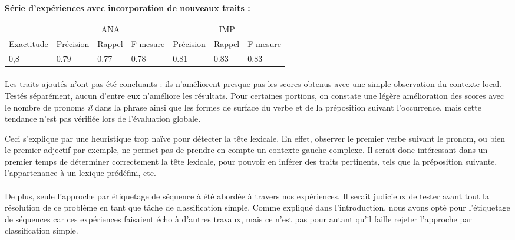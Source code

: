 \documentclass[a4paper,12pt]{article}
\begin{document}
\paragraph{}
\textbf{Série d'expériences avec incorporation de nouveaux traits :}

\begin{tabular}[H]{l|lll|lll}
& \multicolumn{3}{c|}{ANA} & \multicolumn{3}{c}{IMP}\\
Exactitude & Précision & Rappel & F-mesure & Précision & Rappel & F-mesure\\
\hline
0,8 & 0.79 & 0.77 & 0.78 & 0.81 & 0.83 & 0.83\\
\hline
\end{tabular}

\paragraph{}
Les traits ajoutés n'ont pas été concluants : ils n'améliorent presque pas les scores obtenus avec une simple observation du contexte local. Testés séparément, aucun d'entre eux n'améliore les résultats. Pour certaines portions, on constate une légère amélioration des scores avec le nombre de pronoms \og \textit{il} \fg{} dans la phrase ainsi que les formes de surface du verbe et de la préposition suivant l'occurrence, mais cette tendance n'est pas vérifiée lors de l'évaluation globale.

Ceci s'explique par une heuristique trop naïve pour détecter la tête lexicale. En effet, observer le premier verbe suivant le pronom, ou bien le premier adjectif par exemple, ne permet pas de prendre en compte un contexte gauche complexe. Il serait donc intéressant dans un premier temps de déterminer correctement la tête lexicale, pour pouvoir en inférer des traits pertinents, tels que la préposition suivante, l'appartenance à un lexique prédéfini, etc.

\paragraph{}
De plus, seule l'approche par étiquetage de séquence à été abordée à travers nos expériences. Il serait judicieux de tester avant tout la résolution de ce problème en tant que tâche de classification simple. Comme expliqué dans l'introduction, nous avons opté pour l'étiquetage de séquences car ces expériences faisaient écho à d'autres travaux, mais ce n'est pas pour autant qu'il faille rejeter l'approche par classification simple.
\end{document}
